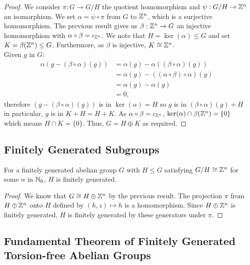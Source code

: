 \begin{proof}
    We consider $\pi : G \to G/H$ the quotient homomorphism and
    $\psi : G/H \to \mathbb{Z}^n$ an isomorphism. We set $\alpha = \psi \circ \pi$
    from $G$ to $\mathbb{Z}^n$, which is a surjective homomorphism.
    The previous result gives us $\beta : \mathbb{Z}^n \to G$ an injective
    homomorphism with \linebreak 
    $\alpha \circ \beta = \iota_{\mathbb{Z}^n}$. We note
    that $H = \ker(\alpha) \leq G$ and set $K = \beta(\mathbb{Z}^n) \leq G$.
    Furthermore, as $\beta$ is injective, $K \cong \mathbb{Z}^n$.
    \\[\baselineskip]
    Given $g$ in $G$: \begin{align*}
        \alpha(g - (\beta \circ \alpha)(g)) 
        &= \alpha(g) - \alpha((\beta \circ \alpha)(g)) \\
        &= \alpha(g) - ((\alpha \circ \beta) \circ \alpha)(g) \\
        &= \alpha(g) - \alpha(g) \\
        &= 0,
    \end{align*} therefore $(g - (\beta \circ \alpha)(g))$ is in 
    $\ker(\alpha) = H$ so $g$ is in $(\beta \circ \alpha)(g) + H$
    in particular, $g$ is in $K + H = H + K$. As 
    $\alpha \circ \beta = \iota_{\mathbb{Z}^n}$, 
    $\ker(\alpha) \cap \beta(\mathbb{Z}^n) = \{0\}$ which means $H \cap K = \{0\}$.
    Thus, $G = H \oplus K$ as required.
\end{proof}

\subsection{Finitely Generated Subgroups}

For a finitely generated abelian group $G$ with $H \leq G$ satisfying
$G / H \cong \mathbb{Z}^n$ for some $n$ in $\mathbb{N}_0$, $H$ is finitely generated.

\begin{proof}
    We know that $G \cong H \oplus \mathbb{Z}^n$ by the previous result.
    The projection $\pi$ from $H \oplus \mathbb{Z}^n$ onto $H$ defined by
    $(h, z) \mapsto h$ is a homomorphism. Since $H \oplus \mathbb{Z}^n$
    is finitely generated, $H$ is finitely generated by these generators
    under $\pi$.
\end{proof}

\subsection{Fundamental Theorem of Finitely Generated Torsion-free Abelian Groups}

